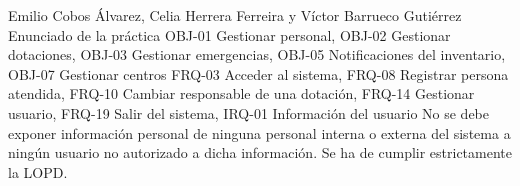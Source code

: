{Emilio Cobos Álvarez, Celia Herrera Ferreira y Víctor Barrueco Gutiérrez}
{Enunciado de la práctica}
{OBJ-01 Gestionar personal, OBJ-02 Gestionar dotaciones, OBJ-03 Gestionar emergencias, OBJ-05 Notificaciones del inventario, OBJ-07 Gestionar centros}
{FRQ-03 Acceder al sistema, FRQ-08 Registrar persona atendida, FRQ-10 Cambiar responsable de una dotación, FRQ-14 Gestionar usuario, FRQ-19 Salir del sistema, IRQ-01 Información del usuario}
{No se debe exponer información personal de ninguna personal interna o externa del sistema a ningún usuario no autorizado a dicha información. Se ha de cumplir estrictamente la LOPD.}

